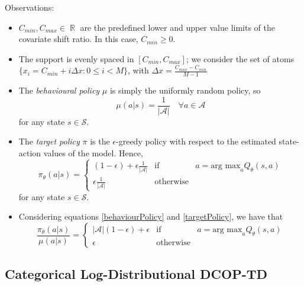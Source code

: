 \documentclass[12pt,a4paper,openright,twoside]{article}
\DeclareMathOperator*{\R}{\mathbb{R}}
\numberwithin{equation}{section}
\theoremstyle{definition}
\theoremstyle{remark}
\theoremstyle{plain}
\begin{document}
Observations:
\begin{itemize}
    \item $C_{min}, C_{max} \in \R$ are the predefined lower and upper value limits of the covariate shift ratio. In this case, $C_{min} \geq 0$.
    \item The support is evenly spaced in $[C_{min}, C_{max}]$; we consider the set of atoms $\{x_i = C_{min} + i \Delta x : 0 \leq i < M \}$, with $\Delta x = \frac{C_{max}-C_{min}}{M-1}$
    \item The \textit{behavioural policy} $\mu$ is simply the uniformly random policy, so 
    \begin{equation} \label{behaviourPolicy}
        \mu(a|s) = \frac{1}{|\mathcal{A}|} \quad \forall a \in \mathcal{A}
    \end{equation}
    for any state $s \in \mathcal{S}$.
    \item The \textit{target policy} $\pi$ is the $\epsilon$-greedy policy with respect to the estimated state-action values of the model. Hence,%
    \begin{equation} \label{targetPolicy}
        \pi_\theta (a|s) = 
        \left\{ 
            \begin{array}{lcc}
                (1-\epsilon)+\epsilon \frac{1}{|\mathcal{A}|} &   \text{if} & a = \text{arg max}_a Q_\theta(s,a) \\
                \epsilon \frac{1}{|\mathcal{A}|} &  \text{otherwise} &
            \end{array}
        \right. 
    \end{equation}
   for any state $s \in \mathcal{S}$.
   \item Considering equations \ref{behaviourPolicy} and \ref{targetPolicy}, we have that
   \begin{equation} \label{policyQuotient}
        \frac{\pi_\theta (a|s)}{\mu(a|s)} = 
        \left\{ 
            \begin{array}{lcc}
                |\mathcal{A}|(1-\epsilon)+\epsilon  &   \text{if} & a = \text{arg max}_a Q_\theta(s,a) \\
                \epsilon  &  \text{otherwise} &
            \end{array}
        \right. 
    \end{equation}
\end{itemize}


\subsection{Categorical Log-Distributional DCOP-TD}
\end{document}
